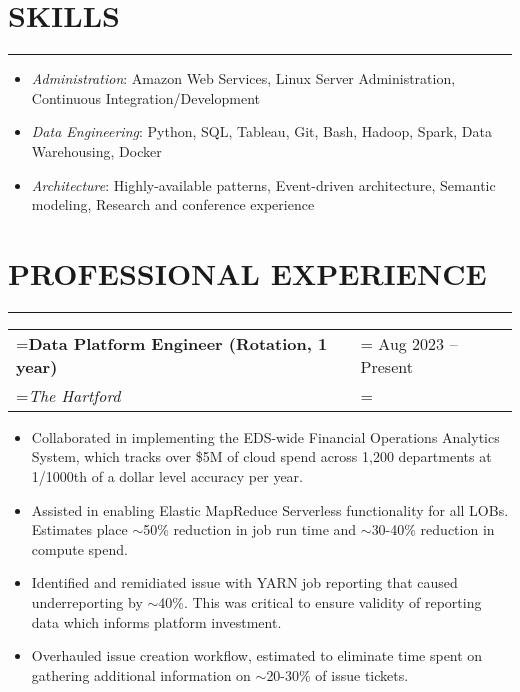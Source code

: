 \documentclass{article}
\begin{document}
\section*{\normalsize{SKILLS}}
\vspace{-1.8em}
\noindent\rule{\textwidth}{.5pt}
\begin{itemize}[label={}, leftmargin=1em]
    \setlength\itemsep{0em}
    \item \textit{Administration}: Amazon Web Services, Linux Server Administration, Continuous Integration/Development
    \item \textit{Data Engineering}: Python, SQL, Tableau, Git, Bash, Hadoop, Spark, Data Warehousing, Docker
    \item \textit{Architecture}: Highly-available patterns, Event-driven architecture, Semantic modeling, Research and conference experience 
\end{itemize}


\section*{\normalsize{PROFESSIONAL EXPERIENCE}}
\vspace{-1.8em}
\noindent\rule{\textwidth}{.5pt}

\vspace{.5em}
\hspace{-1em}
\begin{tabularx}{\textwidth}{
    >{\raggedright\arraybackslash\hsize=1\hsize\linewidth=\hsize}X
    >{\raggedleft\arraybackslash\hsize=1\hsize\linewidth=\hsize}X }
    \textbf{Data Platform Engineer (Rotation, 1 year)} & Aug 2023 -- Present\\
    \textit{The Hartford} & \\
\end{tabularx}
\vspace{-.5em}
\begin{itemize}[label={--}, leftmargin=1em]
    \setlength\itemsep{0em}
    \item Collaborated in implementing the EDS-wide Financial Operations Analytics System, which tracks over \$5M of cloud spend across 1,200 departments at 1/1000th of a dollar level accuracy per year.
    \item Assisted in enabling Elastic MapReduce Serverless functionality for all LOBs. Estimates place $\sim$50\% reduction in job run time and $\sim$30-40\% reduction in compute spend.
    \item Identified and remidiated issue with YARN job reporting that caused underreporting by $\sim$40\%. This was critical to ensure validity of reporting data which informs platform investment.
    \item Overhauled issue creation workflow, estimated to eliminate time spent on gathering additional information on $\sim$20-30\% of issue tickets. 
\end{itemize}
\end{document}
